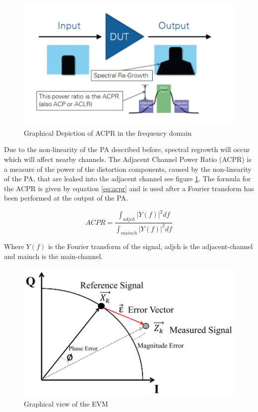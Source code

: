\begin{figure}[H]
\centering 
\includegraphics[scale = 0.5]{figures/ch1/acpr.png}
\caption{Graphical Depiction of ACPR in the frequency domain \citep{NI}}
\label{fig:acpr}
\end{figure}

Due to the non-linearity of the PA described before, spectral regrowth will occur which will affect nearby channels. The Adjacent Channel Power Ratio (ACPR) is a measure of the power of the distortion components, caused by the non-linearity of the PA, that are leaked into the adjacent channel see figure \ref{fig:acpr}. The formula for the ACPR is given by equation \ref{eq:acpr} and is used after a Fourier transform has been performed at the output of the PA.

\begin{equation} \label{eq:acpr}
	ACPR = \frac{\int_{adjch}^{} |Y(f)|^2 df }{\int_{mainch}^{} |Y(f)|^2 df}
\end{equation}   

Where $Y(f)$ is the Fourier transform of the signal, adjch is the adjacent-channel and mainch is the main-channel. 

\begin{figure}[H]
\centering 
\includegraphics[scale = 0.8]{figures/ch1/evm.png}
\caption{Graphical view of the EVM}
\label{fig:evm}
\end{figure}
  
